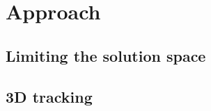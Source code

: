 \section{Approach}
\label{approach}

\subsection{Limiting the solution space}
\label{approach/kinematics}

\subsection{3D tracking}
\label{approach/controller}
